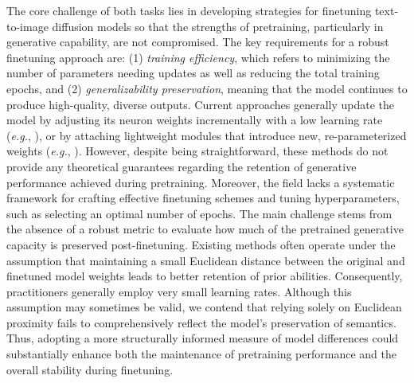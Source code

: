 The core challenge of both tasks lies in developing strategies for finetuning text-to-image diffusion models so that the strengths of pretraining, particularly in generative capability, are not compromised. The key requirements for a robust finetuning approach are: (1) \emph{training efficiency}, which refers to minimizing the number of parameters needing updates as well as reducing the total training epochs, and (2) \emph{generalizability preservation}, meaning that the model continues to produce high-quality, diverse outputs. Current approaches generally update the model by adjusting its neuron weights incrementally with a low learning rate (\emph{e.g.}, \cite{ruiz2023dreambooth}), or by attaching lightweight modules that introduce new, re-parameterized weights (\emph{e.g.}, \cite{hulora2022,zhang2023adding}). However, despite being straightforward, these methods do not provide any theoretical guarantees regarding the retention of generative performance achieved during pretraining. Moreover, the field lacks a systematic framework for crafting effective finetuning schemes and tuning hyperparameters, such as selecting an optimal number of epochs. The main challenge stems from the absence of a robust metric to evaluate how much of the pretrained generative capacity is preserved post-finetuning. Existing methods often operate under the assumption that maintaining a small Euclidean distance between the original and finetuned model weights leads to better retention of prior abilities. Consequently, practitioners generally employ very small learning rates. Although this assumption may sometimes be valid, we contend that relying solely on Euclidean proximity fails to comprehensively reflect the model’s preservation of semantics. Thus, adopting a more structurally informed measure of model differences could substantially enhance both the maintenance of pretraining performance and the overall stability during finetuning.

